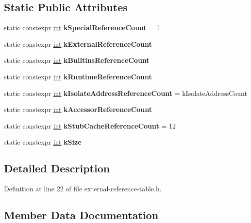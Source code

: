 \subsection*{Static Public Attributes}
\begin{DoxyCompactItemize}
\item 
\mbox{\label{classv8_1_1internal_1_1ExternalReferenceTable_a048a513a50cb09c02f67a6d4fe54486d}} 
static constexpr \mbox{\hyperlink{classint}{int}} {\bfseries k\+Special\+Reference\+Count} = 1
\item 
static constexpr \mbox{\hyperlink{classint}{int}} {\bfseries k\+External\+Reference\+Count}
\item 
static constexpr \mbox{\hyperlink{classint}{int}} {\bfseries k\+Builtins\+Reference\+Count}
\item 
static constexpr \mbox{\hyperlink{classint}{int}} {\bfseries k\+Runtime\+Reference\+Count}
\item 
\mbox{\label{classv8_1_1internal_1_1ExternalReferenceTable_ae0b9630cf366d916c1693a0137d3062b}} 
static constexpr \mbox{\hyperlink{classint}{int}} {\bfseries k\+Isolate\+Address\+Reference\+Count} = k\+Isolate\+Address\+Count
\item 
static constexpr \mbox{\hyperlink{classint}{int}} {\bfseries k\+Accessor\+Reference\+Count}
\item 
\mbox{\label{classv8_1_1internal_1_1ExternalReferenceTable_abc3b88cd5494bbf9e78277b80fb03dac}} 
static constexpr \mbox{\hyperlink{classint}{int}} {\bfseries k\+Stub\+Cache\+Reference\+Count} = 12
\item 
static constexpr \mbox{\hyperlink{classint}{int}} {\bfseries k\+Size}
\end{DoxyCompactItemize}


\subsection{Detailed Description}


Definition at line 22 of file external-\/reference-\/table.\+h.



\subsection{Member Data Documentation}
\mbox{\label{classv8_1_1internal_1_1ExternalReferenceTable_ac68155f1156b2d0024e4738ae5f81a6a}} 
